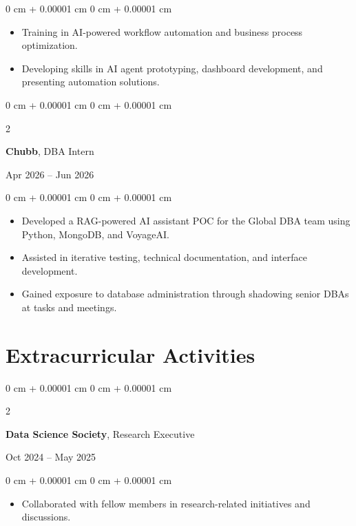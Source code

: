 \documentclass[10pt, letterpaper]{article}
\newenvironment{highlights}{
    \begin{itemize}[
        topsep=0.04 cm,
        parsep=0.04 cm,
        partopsep=0pt,
        itemsep=0pt,
        leftmargin=0 cm + 10pt
    ]
}{
    \end{itemize}
} %
\newenvironment{onecolentry}{
    \begin{adjustwidth}{
        0 cm + 0.00001 cm
    }{
        0 cm + 0.00001 cm
    }
}{
    \end{adjustwidth}
} %
\newenvironment{twocolentry}[2][]{
    \onecolentry
    \def\secondColumn{#2}
    \setcolumnwidth{\fill, 4.5 cm}
    \begin{paracol}{2}
}{
    \switchcolumn \raggedleft \secondColumn
    \end{paracol}
    \endonecolentry
} %
\begin{document}
\vspace{0.05 cm}
\begin{onecolentry}
    \begin{highlights}
        \item Training in AI-powered workflow automation and business process optimization.
        \item Developing skills in AI agent prototyping, dashboard development, and presenting automation solutions.
    \end{highlights}
\end{onecolentry}
\vspace{0.08 cm}
\begin{twocolentry}{
    Apr 2026 -- Jun 2026
}
    \textbf{Chubb}, DBA Intern
\end{twocolentry}

\vspace{0.05 cm}
\begin{onecolentry}
    \begin{highlights}
        \item Developed a RAG-powered AI assistant POC for the Global DBA team using Python, MongoDB, and VoyageAI.
        \item Assisted in iterative testing, technical documentation, and interface development.
        \item Gained exposure to database administration through shadowing senior DBAs at tasks and meetings.
    \end{highlights}
\end{onecolentry}

\section{Extracurricular Activities}

\begin{twocolentry}{
    Oct 2024 -- May 2025
}
    \textbf{Data Science Society}, Research Executive
\end{twocolentry}

\vspace{0.05 cm}
\begin{onecolentry}
    \begin{highlights}
        \item Collaborated with fellow members in research-related initiatives and discussions.
    \end{highlights}
\end{onecolentry}
\end{document}
